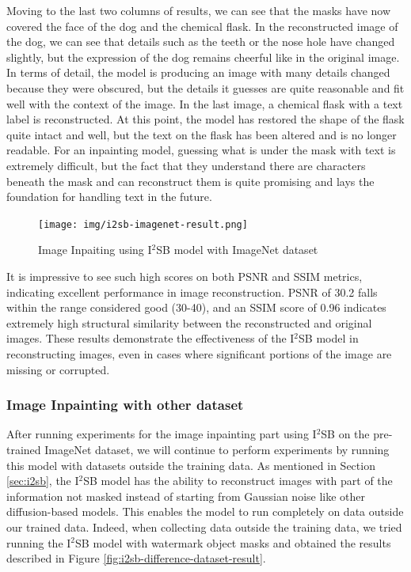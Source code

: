 Moving to the last two columns of results, we can see that the masks have now covered the face of the dog and the chemical flask. In the reconstructed image of the dog, we can see that details such as the teeth or the nose hole have changed slightly, but the expression of the dog remains cheerful like in the original image. In terms of detail, the model is producing an image with many details changed because they were obscured, but the details it guesses are quite reasonable and fit well with the context of the image. In the last image, a chemical flask with a text label is reconstructed. At this point, the model has restored the shape of the flask quite intact and well, but the text on the flask has been altered and is no longer readable. For an inpainting model, guessing what is under the mask with text is extremely difficult, but the fact that they understand there are characters beneath the mask and can reconstruct them is quite promising and lays the foundation for handling text in the future.

\begin{figure}[t]
    \centering
    \texttt{[image: img/i2sb-imagenet-result.png]}
    \caption[Image Inpaiting using I$^2$SB model with ImageNet dataset]{Image Inpaiting using I$^2$SB model with ImageNet dataset}
    \label{fig:i2sb-imagenet-result}
\end{figure}
It is impressive to see such high scores on both PSNR and SSIM metrics, indicating excellent performance in image reconstruction. PSNR of 30.2 falls within the range considered good (30-40), and an SSIM score of 0.96 indicates extremely high structural similarity between the reconstructed and original images. These results demonstrate the effectiveness of the I$^2$SB model in reconstructing images, even in cases where significant portions of the image are missing or corrupted.
\subsubsection{Image Inpainting with other dataset}
After running experiments for the image inpainting part using I$^2$SB on the pre-trained ImageNet dataset, we will continue to perform experiments by running this model with datasets outside the training data. As mentioned in Section \ref{sec:i2sb}, the I$^2$SB model has the ability to reconstruct images with part of the information not masked instead of starting from Gaussian noise like other diffusion-based models. This enables the model to run completely on data outside our trained data. Indeed, when collecting data outside the training data, we tried running the I$^2$SB model with watermark object masks and obtained the results described in Figure \ref{fig:i2sb-difference-dataset-result}.

